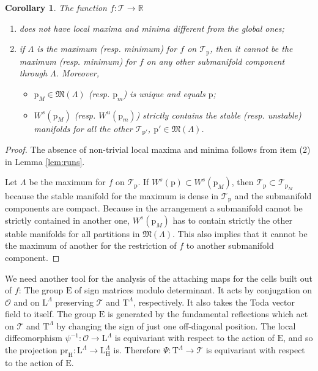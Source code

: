 \documentclass[reqno]{amsart}
\newcommand{\p}{\mathrm{p}}
\newcommand{\cO}{\mathcal{O}}
\newcommand{\cT}{\mathcal{T}}
\newcommand{\R}{\mathbb{R}}
\newcommand{\E}{\mathrm{E}}
\newcommand{\T}{\mathbb{T}}
\newcommand{\pr}{\mathrm{pr}}
\renewcommand{\L}{\mathrm{L}}
\renewcommand{\T}{\mathrm{T}}
\renewcommand{\H}{\mathrm{H}}
\newtheorem{corollary}[theorem]{Corollary}
\begin{document}
\begin{corollary}\label{cor:morse-ordering} The function $f:\cT\to \R$
\begin{enumerate}
 \item does not have local maxima and minima different from the global ones;
 \item if $\Lambda$ is the maximum (resp. minimum) for $f$ on $\cT_{\p}$, then it cannot be the maximum (resp.
 minimum) for $f$ on any other submanifold component through $\Lambda$. Moreover,
 \begin{itemize}
  \item $\p_M\in \mathfrak{M}(\Lambda)$ (resp. $\p_m$) is unique and equals $\p$;
  \item $W^s(\p_M)$ (resp. $W^u(\p_m)$) strictly contains the  stable (resp. unstable) manifolds for all the other $\cT_{\p'}$, $\p'\in \mathfrak{M}(\Lambda)$.
 \end{itemize}
\end{enumerate}
\end{corollary}
\begin{proof}
 The absence of non-trivial local maxima and minima follows from item (2) in Lemma \ref{lem:runs}.

 Let $\Lambda$ be the maximum for $f$ on $\cT_{\p}$. If $W^s(\p)\subset W^s(\p_M)$, then $\cT_{\p}\subset \cT_{\p_M}$ because the stable manifold for the maximum is dense in $\cT_{\p}$ and the submanifold components are compact. Because in the arrangement a submanifold cannot be strictly contained in another one, $W^s(\p_M)$ has to contain strictly the other stable manifolds for all partitions in $\mathfrak{M}(\Lambda)$. This also implies that it cannot be the maximum of another for the restriction of $f$ to another submanifold component.
\end{proof}



We need another tool for the analysis of the attaching maps for the cells built out of $f$: The group $\E$ of sign matrices modulo determinant. It acts by conjugation on $\cO$ and on $\L^\Lambda$
preserving $\cT$ and $\T^\Lambda$, respectively. It also takes the Toda vector field to itself. The group $\E$ is generated by the fundamental reflections which act on $\cT$ and $\T^\Lambda$ by changing the sign of just one off-diagonal position. The local diffeomorphism $\psi^{-1}:\cO\to \L^\Lambda$ is equivariant with respect to the action of $\E$, and so the projection $\pr_\H:\L^\Lambda\to \L^\Lambda_\H$ is. Therefore $\Psi:\T^\Lambda\to \cT$ is equivariant with respect to the action of $\E$.
\end{document}
